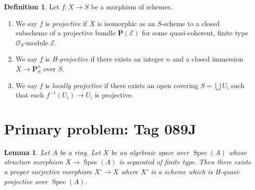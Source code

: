 \documentclass{amsart}
\theoremstyle{plain}
\newtheorem{lemma}[subsection]{Lemma}
\theoremstyle{definition}
\newtheorem{definition}[subsection]{Definition}
\theoremstyle{remark}
\numberwithin{equation}{subsection}
\def\Spec{\mathop{\mathrm{Spec}}}
\begin{document}
\begin{definition}
\label{morphisms-definition-projective}
Let $f : X \to S$ be a morphism of schemes.
\begin{enumerate}
\item We say $f$ is {\it projective} if $X$ is isomorphic as
an $S$-scheme to a closed subscheme of a projective
bundle $\mathbf{P}(\mathcal{E})$
for some quasi-coherent, finite type $\mathcal{O}_S$-module $\mathcal{E}$.
\item We say $f$ is {\it H-projective} if there exists an integer $n$ and
a closed immersion $X \to \mathbf{P}^n_S$ over $S$.
\item We say $f$ is {\it locally projective} if there exists an open
covering $S = \bigcup U_i$ such that each $f^{-1}(U_i) \to U_i$ is
projective.
\end{enumerate}
\end{definition}

\section*{Primary problem: Tag 089J}
\begin{lemma}
\label{lemma-weak-chow}
Let $A$ be a ring. Let $X$ be an algebraic space over $\Spec(A)$
whose structure morphism $X \to \Spec(A)$ is separated of finite type.
Then there exists a proper surjective morphism $X' \to X$
where $X'$ is a scheme which is H-quasi-projective over $\Spec(A)$.
\end{lemma}
\end{document}
